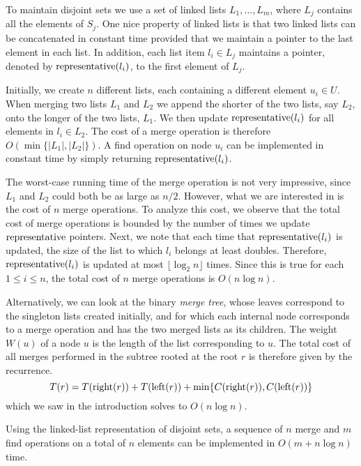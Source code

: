To maintain disjoint sets we use a set of linked lists
$L_1,\ldots,L_m$, where $L_j$ contains all the elements of $S_j$.  One
nice property of linked lists is that two linked lists can be
concatenated in constant time provided that we maintain a pointer to
the last element in each list.  In addition, each list item $l_i\in
L_j$ maintains a pointer, denoted by $\mathrm{representative}(l_i)$, to the first element of
$L_j$.

Initially, we create $n$ different lists, each containing a different
element $u_i\in U$.  When merging two lists $L_1$ and $L_2$ we append
the shorter of the two lists, say $L_2$, onto the longer of the two
lists, $L_1$.  We then update $\mathrm{representative}(l_i)$ for all elements in $l_i\in
L_2$.  The cost of a merge operation is therefore
$O(\min\{|L_1|,|L_2|\})$.  A find operation on node $u_i$ can be
implemented in constant time by simply returning $\mathrm{representative}(l_i)$.

The worst-case running time of the merge operation is not very
impressive, since $L_1$ and $L_2$ could both be as large as $n/2$.
However, what we are interested in is the cost of $n$ merge
operations.  To analyze this cost, we observe that the total cost of
merge operations is bounded by the number of times we update $\mathrm{representative}$
pointers.  Next, we note that each time that $\mathrm{representative}(l_i)$ is updated,
the size of the list to which $l_i$ belongs at least doubles.
Therefore, $\mathrm{representative}(l_i)$ is updated at most $\lfloor\log_2 n\rfloor$
times.  Since this is true for each $1\le i\le n$, the total cost of
$n$ merge operations is $O(n\log n)$.

Alternatively, we can look at the binary \emph{merge tree}, whose
leaves correspond to the singleton lists created initially, and for
which each internal node corresponds to a merge operation and has the
two merged lists as its children.  The weight $W(u)$ of a node $u$ is
the length of the list corresponding to $u$.  The total cost of all
merges performed in the subtree rooted at the root $r$ is therefore
given by the recurrence.
\[
	T(r) = T(\mathrm{right}(r)) + T(\mathrm{left}(r)) + \min\{C(\mathrm{right}(r)),C(\mathrm{left}(r))\}
\]
which we saw in the introduction solves to $O(n\log n)$.

\begin{thm}
Using the linked-list representation of disjoint sets, a sequence of
$n$ merge and $m$ find operations on a total of $n$ elements can be
implemented in $O(m+n\log n)$ time.
\end{thm}

